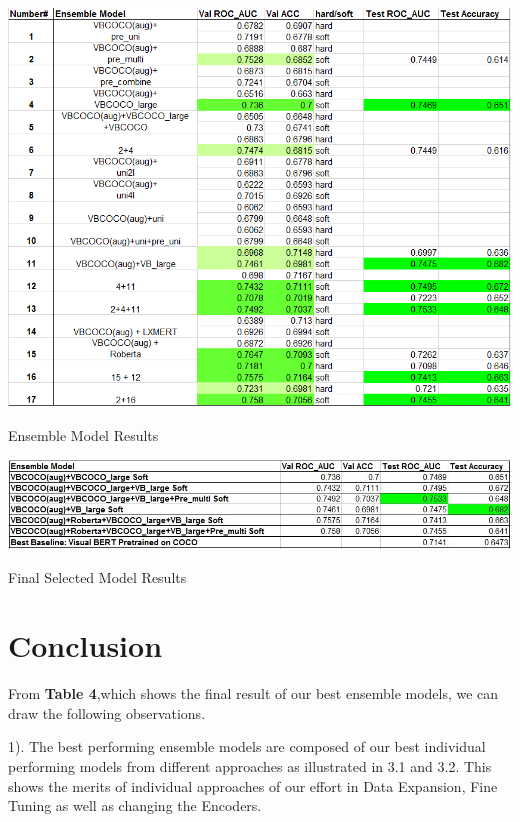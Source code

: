 \documentclass[10pt,twocolumn,letterpaper]{article}
\begin{document}
\begin{table}[]
\begin{center}
\includegraphics[scale=0.65]{images/Ensemble.png}
\caption{Ensemble Model Results}
\end{center}
\end{table}

\begin{table}[]
\begin{center}
\includegraphics[scale=0.65]{images/Models.jpg}
\caption{Final Selected Model Results}
\end{center}
\end{table}


\section{Conclusion}
From \textbf{Table 4},which shows the final result of our best ensemble models, we can draw the following observations.

1). The best performing ensemble models are composed of our best individual performing models from different approaches as illustrated in 3.1 and 3.2. This shows the merits of individual approaches of our effort in Data Expansion, Fine Tuning as well as changing the Encoders. 
\end{document}
